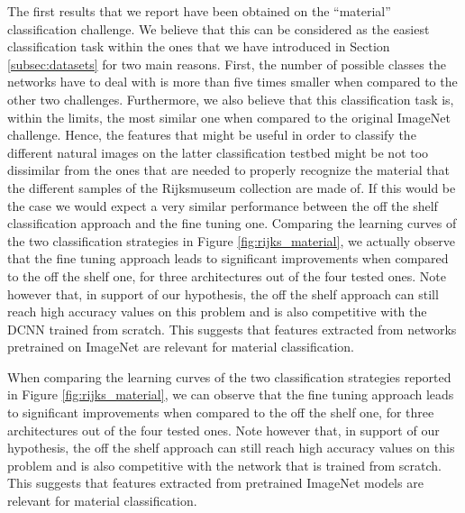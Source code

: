 The first results that we report have been obtained on the ``material'' classification challenge. We believe that this can be considered as the easiest classification task within the ones that we have introduced in Section \ref{subsec:datasets} for two main reasons. First, the number of possible classes the networks have to deal with is more than five times smaller when compared to the other two challenges. Furthermore, we also believe that this classification task is, within the limits, the most similar one when compared to the original ImageNet challenge. Hence, the features that might be useful in order to classify the different natural images on the latter classification testbed might be not too dissimilar from the ones that are needed to properly recognize the material that the different samples of the Rijksmuseum collection are made of. If this would be the case we would expect a very similar performance between the off the shelf classification approach and the fine tuning one.
Comparing the learning curves of the two classification strategies in Figure \ref{fig:rijks_material}, we actually observe that the fine tuning approach leads to significant improvements when compared to the off the shelf one, for three architectures out of the four tested ones. Note however that, in support of our hypothesis, the off the shelf approach can still reach high accuracy values on this problem and is also competitive with the DCNN trained from scratch. This suggests that features extracted from networks pretrained on ImageNet are relevant for material classification.

When comparing the learning curves of the two classification strategies reported in Figure \ref{fig:rijks_material}, we can observe that the fine tuning approach leads to significant improvements when compared to the off the shelf one, for three architectures out of the four tested ones. Note however that, in support of our hypothesis, the off the shelf approach can still reach high accuracy values on this problem and is also competitive with the network that is trained from scratch. This suggests that features extracted from pretrained ImageNet models are relevant for material classification.




